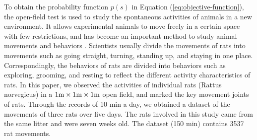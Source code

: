 
To obtain the probability function $p(s)$ in Equation (\ref{eq:objective-function}),
the open-field test is used to study the spontaneous activities of animals in a
new environment. It allows experimental animals to move freely in a certain
space with few restrictions, and has become an important method to study animal
movements and behaviors \cite{PRUT20033, EILAM200353}. Scientists usually divide
the movements of rats into movements such as going straight, turning, standing
up, and staying in one place. Correspondingly, the behaviors of rats are divided
into behaviors such as exploring, grooming, and resting to reflect the different
activity characteristics of rats\cite{the_rat_study,whishow_bejavior,
MARSHALL2021420,dunn_profiling}. In this paper, we observed the activities of
individual rats (Rattus norvegicus) in a $1{\rm m}\times 1{\rm m}\times 1{\rm m}
$ open field, and marked the key movement joints of rats. Through the records of
10 min a day, we obtained a dataset of the movements of three rats over five
days. The rats involved in this study came from the same litter and were seven
weeks old. The dataset (150 min) contains 3537 rat movements.

